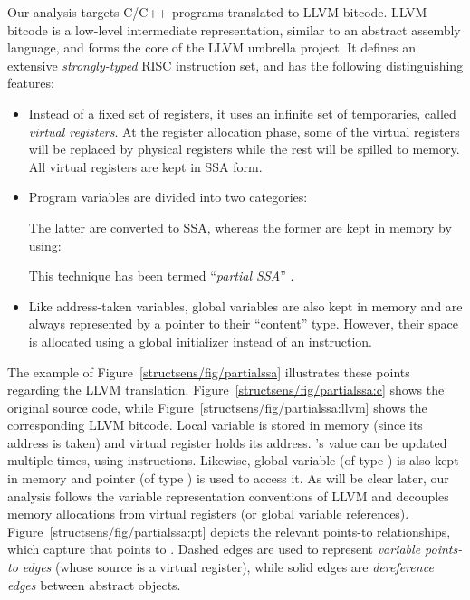 Our analysis targets C/C++ programs translated to LLVM bitcode. LLVM
bitcode is a low-level intermediate representation, similar to an
abstract assembly language, and forms the core of the LLVM umbrella
project. It defines an extensive \emph{strongly-typed} RISC
instruction set, and has the following distinguishing features:
\begin{itemize}
\item Instead of a fixed set of registers, it uses an infinite set of
  temporaries, called \emph{virtual registers}. At the
  register allocation phase, some of the virtual registers will be replaced
  by physical registers while the rest will be spilled to memory. All
  virtual registers are kept in SSA form.
\item Program variables are divided into two categories:
  The latter are converted to SSA, whereas the former are kept in
  memory by using:
  This technique has been termed ``\emph{partial SSA}''
  \cite{cgo/HardekopfL11}.
\item Like address-taken variables, global variables are also kept in
  memory and are always represented by a pointer to their ``content''
  type. However, their space is allocated using a global initializer
  instead of an  instruction.
\end{itemize}

The example of Figure~\ref{structsens/fig/partialssa} illustrates
these points regarding the LLVM
translation. Figure~\ref{structsens/fig/partialssa:c} shows the
original source code, while
Figure~\ref{structsens/fig/partialssa:llvm} shows the corresponding
LLVM bitcode. Local variable  is stored in memory (since its
address is taken) and virtual register  holds its
address. 's value can be updated multiple times, using
 instructions. Likewise, global variable  (of
type ) is also kept in memory and pointer  (of
type ) is used to access it. As will be clear later, our
analysis follows the variable representation conventions of LLVM and
decouples memory allocations from virtual registers (or global
variable references). Figure~\ref{structsens/fig/partialssa:pt}
depicts the relevant points-to relationships, which capture that
 points to .
%
Dashed edges are used to represent \emph{variable points-to edges}
(whose source is a virtual register), while solid edges are
\emph{dereference edges} between abstract objects.


